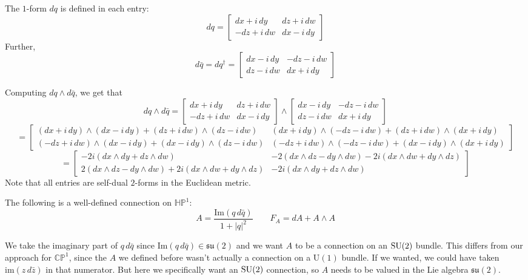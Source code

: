 \documentclass[main]{subfiles}
\begin{document}
\begin{definition}
The $1$-form $dq$ is defined in each entry:
\[
dq = \begin{bmatrix}dx+i\,dy & dz+i\,dw\\ -dz+i\,dw & dx-i\,dy\end{bmatrix}
\]
Further,
\[
d\bar q = dq^\dagger = \begin{bmatrix}dx-i\,dy & -dz-i\,dw\\ dz-i\,dw & dx+i\,dy\end{bmatrix}
\]
\end{definition}

Computing $dq\wedge d\bar q$, we get that
\[
dq\wedge d\bar q = \begin{bmatrix}dx+i\,dy & dz+i\,dw\\ -dz+i\,dw & dx-i\,dy\end{bmatrix}\wedge\begin{bmatrix}dx-i\,dy & -dz-i\,dw\\ dz-i\,dw & dx+i\,dy\end{bmatrix}
\]
{\footnotesize
\[
= \begin{bmatrix}
(dx+i\,dy)\wedge(dx-i\,dy)+(dz+i\,dw)\wedge(dz-i\,dw) & (dx+i\,dy)\wedge(-dz-i\,dw)+(dz+i\,dw)\wedge(dx+i\,dy)\\
(-dz+i\,dw)\wedge(dx-i\,dy)+(dx-i\,dy)\wedge(dz-i\,dw) & (-dz+i\,dw)\wedge(-dz-i\,dw)+(dx-i\,dy)\wedge(dx+i\,dy)
\end{bmatrix}
\]}
\[
= \begin{bmatrix}
-2i(dx\wedge dy+dz\wedge dw) & -2(dx\wedge dz-dy\wedge dw)-2i(dx\wedge dw+dy\wedge dz)\\
2(dx\wedge dz-dy\wedge dw)+2i(dx\wedge dw+dy\wedge dz) & -2i(dx\wedge dy+dz\wedge dw)
\end{bmatrix}
\]
Note that all entries are self-dual $2$-forms in the Euclidean metric.

\begin{proposition}
The following is a well-defined connection on $\mathbb{HP}^1$:
\[
A = \frac{\mathrm{Im}(q\,d\bar q)}{1+|q|^2} \qquad F_A = dA+A\wedge A
\]
\end{proposition}

\begin{remark}
We take the imaginary part of $q\,d\bar q$ since $\mathrm{Im}(q\,d\bar q)\in\mathfrak{su}(2)$ and we want $A$ to be a connection on an $\operatorname{SU}(2)$ bundle. This differs from our approach for $\mathbb{CP}^1$, since the $A$ we defined before wasn't actually a connection on a $\mathrm{U}(1)$ bundle. If we wanted, we could have taken $\mathrm{im}(z\,d\bar z)$ in that numerator. But here we specifically want an $\operatorname{SU}(2)$ connection, so $A$ needs to be valued in the Lie algebra $\mathfrak{su}(2)$.
\end{remark}
\end{document}
